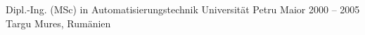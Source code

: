 \cveducation
  {Dipl.-Ing. (MSc) in Automatisierungstechnik}
  {Universität Petru Maior}
  {2000 -- 2005}
  {Targu Mures, Rumänien}
  {}
